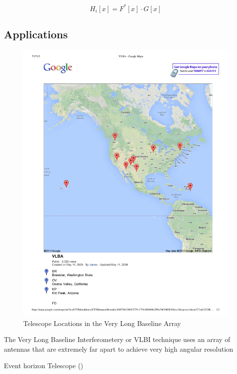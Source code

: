 \[H_i[x] = F^*[x] \cdot G[x]\]

\subsection{Applications}

\begin{figure}[ht!]
  \centering
    \includegraphics[width=\textwidth]{Images/C3/vlba.pdf}
  \caption{Telescope Locations in the Very Long Baseline Array}
  \label{fig: C3/vlba.pdf}
\end{figure}

The Very Long Baseline Interferometery or VLBI technique uses an array of antennas that are extremely far apart to achieve very high angular resolution


Event horizon Telescope (\cite{2012Sci...338..355D})


%

